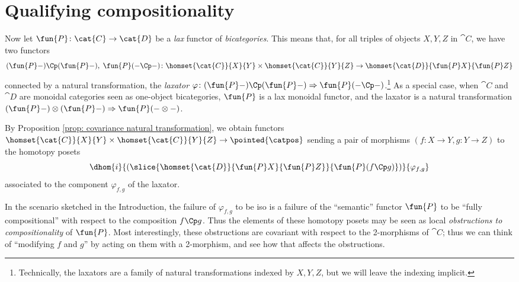 \section{Qualifying compositionality} \label{sec: qualifying}

Now let $\fun{P}\colon \cat{C} \to \cat{D}$ be a \emph{lax} functor of \emph{bicategories}.
This means that, for all triples of objects $X, Y, Z$ in $\cat{C}$, we have two functors
\begin{equation*}
    (\fun{P}-) \Cp (\fun{P}-), \; \fun{P}(- \Cp -)\colon \homset{\cat{C}}{X}{Y} \times \homset{\cat{C}}{Y}{Z} \to \homset{\cat{D}}{\fun{P}X}{\fun{P}Z}
\end{equation*}
connected by a natural transformation, the \emph{laxator} $\varphi\colon (\fun{P}-) \Cp (\fun{P}-) \Rightarrow \fun{P}(- \Cp -)$.\footnote{Technically, the laxators are a family of natural transformations indexed by $X, Y, Z$, but we will leave the indexing implicit.}
As a special case, when $\cat{C}$ and $\cat{D}$ are monoidal categories seen as one-object bicategories, $\fun{P}$ is a lax monoidal functor, and the laxator is a natural transformation $(\fun{P}-) \otimes (\fun{P}-) \Rightarrow \fun{P}(- \otimes -)$.

By Proposition \ref{prop: covariance natural transformation}, we obtain functors $\homset{\cat{C}}{X}{Y} \times \homset{\cat{C}}{Y}{Z} \to \pointed{\catpos}$
sending a pair of morphisms $(f\colon X \to Y, g\colon Y \to Z)$ to the homotopy posets
\begin{equation*}
    \dhom{i}
    {(\slice{\homset{\cat{D}}{\fun{P}X}{\fun{P}Z}}{\fun{P}(f\Cp g)})}
    {\varphi_{f,g}}
\end{equation*}
associated to the component $\varphi_{f,g}$ of the laxator.

In the scenario sketched in the Introduction, the failure of $\varphi_{f,g}$ to be iso is a failure of the ``semantic'' functor $\fun{P}$ to be ``fully compositional'' with respect to the composition $f \Cp g$.
Thus the elements of these homotopy posets may be seen as local \emph{obstructions to compositionality} of $\fun{P}$.
Most interestingly, these obstructions are covariant with respect to the 2-morphisms of $\cat{C}$; thus we can think of ``modifying $f$ and $g$'' by acting on them with a 2-morphism, and see how that affects the obstructions.

